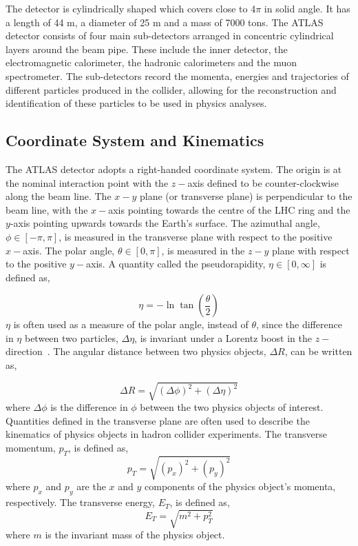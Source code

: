 The detector is cylindrically shaped which covers close to 4$\pi$ in solid angle. It has a length of 44 m, a diameter of 25 m and a mass of 7000 tons. The ATLAS detector consists of four main sub-detectors arranged in concentric cylindrical layers around the beam pipe. These include the inner detector, the electromagnetic calorimeter, the hadronic calorimeters and the muon spectrometer. The sub-detectors record the momenta, energies and trajectories of different particles produced in the collider, allowing for the reconstruction and identification of these particles to be used in physics analyses.

\subsection{Coordinate System and Kinematics}

The ATLAS detector adopts a right-handed coordinate system. The origin is at the nominal interaction point with the $z-$axis defined to be counter-clockwise along the beam line. The $x-y$ plane (or transverse plane) is perpendicular to the beam line, with the $x-$axis pointing towards the centre of the LHC ring and the $y$-axis pointing upwards towards the Earth's surface. The azimuthal angle, $\phi \in [-\pi, \pi]$, is measured in the transverse plane with respect to the positive $x-$axis. The polar angle, $\theta \in [0,\pi]$, is measured in the $z-y$ plane with respect to the positive $y-$axis. A quantity called the pseudorapidity, $\eta \in [0,\infty]$ is defined as,

\begin{equation}
\eta = -\ln{\tan{\left(\frac{\theta}{2}\right)}}
\end{equation}
$\eta$ is often used as a measure of the polar angle, instead of $\theta$, since the difference in $\eta$ between two particles, $\Delta \eta$, is invariant under a Lorentz boost in the $z-$direction~\cite{Tovey_2019}. The angular distance between two physics objects, $\Delta R$, can be written as,

\begin{equation}
\Delta R = \sqrt{(\Delta\phi)^{2} + (\Delta\eta)^{2}}
\end{equation}
where $\Delta\phi$ is the difference in $\phi$ between the two physics objects of interest. Quantities defined in the transverse plane are often used to describe the kinematics of physics objects in hadron collider experiments. The transverse momentum, $p_{T}$, is defined as,
\begin{equation}
p_{T}= \sqrt{(p_{x})^{2} + (p_{y})^{2}}
\end{equation}
where $p_{x}$ and $p_{y}$ are the $x$ and $y$ components of the physics object's momenta, respectively. The transverse energy, $E_{T}$, is defined as,
\begin{equation}
E_{T} = \sqrt{m^{2} + p_{T}^{2}}
\end{equation}
where $m$ is the invariant mass of the physics object. 

